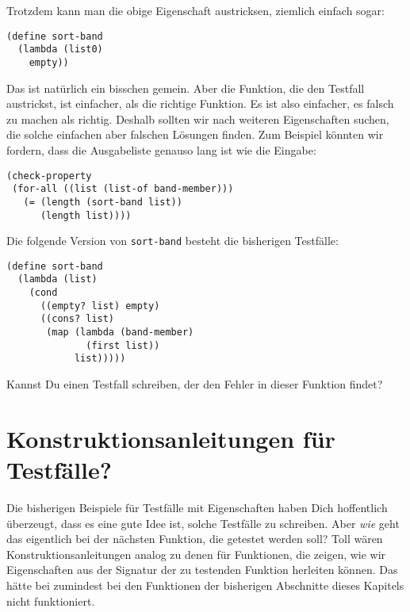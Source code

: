 Trotzdem kann man die obige Eigenschaft austricksen, ziemlich einfach
sogar:
%
\begin{lstlisting}
(define sort-band
  (lambda (list0)
    empty))
\end{lstlisting}
%
Das ist natürlich ein bisschen gemein.  Aber die Funktion, die den
Testfall austrickst, ist einfacher, als die richtige Funktion.  Es ist
also einfacher, es falsch zu machen als richtig.  Deshalb sollten wir
nach weiteren Eigenschaften suchen, die solche einfachen aber falschen
Lösungen finden.  Zum Beispiel könnten wir fordern, dass die
Ausgabeliste genauso lang ist wie die Eingabe:
%
\begin{lstlisting}
(check-property
 (for-all ((list (list-of band-member)))
   (= (length (sort-band list))
      (length list))))
\end{lstlisting}
%
\begin{aufgabeinline}
  Die folgende Version von \lstinline{sort-band} besteht die
  bisherigen Testfälle:
\begin{lstlisting}
(define sort-band
  (lambda (list)
    (cond
      ((empty? list) empty)
      ((cons? list)
       (map (lambda (band-member)
              (first list))
            list)))))
\end{lstlisting}
  Kannst Du einen Testfall schreiben, der den Fehler in dieser
  Funktion findet?
\end{aufgabeinline}


\section{Konstruktionsanleitungen für Testfälle?}
\label{sec:ka-testfaelle}

Die bisherigen Beispiele für Testfälle mit Eigenschaften haben Dich
hoffentlich überzeugt, dass es eine gute Idee ist, solche Testfälle zu
schreiben.  Aber \emph{wie} geht das eigentlich bei der nächsten
Funktion, die getestet werden soll?  Toll wären
Konstruktionsanleitungen analog zu denen für Funktionen, die zeigen,
wie wir Eigenschaften aus der Signatur der zu testenden Funktion
herleiten können.  Das hätte bei zumindest bei den Funktionen der
bisherigen Abschnitte dieses Kapitels nicht funktioniert.

